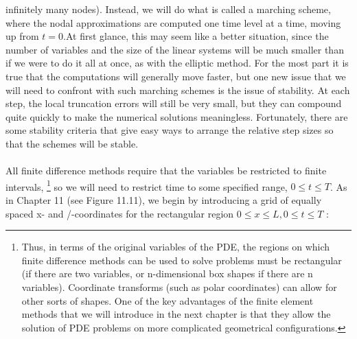 \documentclass[../main.tex]{subfiles}
\begin{document}
{{infinitely many nodes). Instead, we will do what is called a marching scheme, 
where the nodal approximations are computed one time level at a time, moving up 
from $t = 0$.At first glance, this may seem like a better situation, since the number 
of variables and the size of the linear systems will be much smaller than if we 
were to do it all at once, as with the elliptic method. For the most part it is true 
that the computations will generally move faster, but one new issue that we will 
need to confront with such marching schemes is the issue of stability. At each 
step, the local truncation errors will still be very small, but they can compound 
quite quickly to make the numerical solutions meaningless. Fortunately, there are 
some stability criteria that give easy ways to arrange the relative step sizes so that 
the schemes will be stable.
\\
\\
All finite difference methods require that the variables be restricted to finite 
intervals,
\footnote{Thus, in terms of the original variables of the PDE, the regions on which finite difference methods 
can be used to solve problems must be rectangular (if there are two variables, or n-dimensional box 
shapes if there are n variables). Coordinate transforms (such as polar coordinates) can allow for other 
sorts of shapes. One of the key advantages of the finite element methods that we will introduce in the 
next chapter is that they allow the solution of PDE problems on more complicated geometrical 
configurations.}
so we will need to restrict time to some specified range, $0 \leqslant t\leqslant T$. As 
in Chapter 11 (see Figure 11.11), we begin by introducing a grid of equally spaced 
x- and /-coordinates for the rectangular region $0\leqslant x\leqslant L, 0\leqslant t \leqslant T$ :

}}
\end{document}
